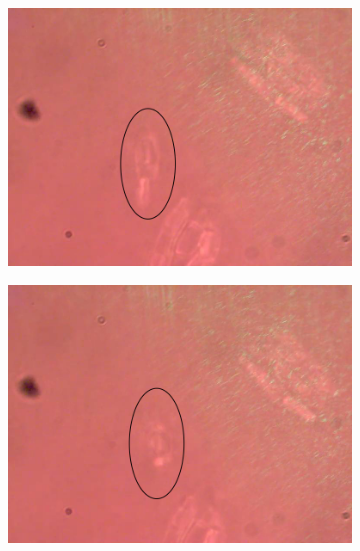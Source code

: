 \documentclass[letterpaper,12pt,oneside]{book}
\begin{document}
\begin{figure}[H] 
  \begin{subfigure}[b]{0.5\linewidth}
    \centering
    \includegraphics[scale=0.3]{Results/Oilnitzchia/firstoil1.png} 
    \caption{}
    \label{fig7:a} 
    \vspace{4ex}
  \end{subfigure}%
  \begin{subfigure}[b]{0.5\linewidth}
    \centering
    \includegraphics[scale=0.3]{Results/Oilnitzchia/oil2first.png} 
    \caption{}
    \label{fig7:b} 
    \vspace{4ex}
  \end{subfigure} 
  \begin{subfigure}[b]{0.5\linewidth}

\end{subfigure}
\end{figure}
\end{document}
